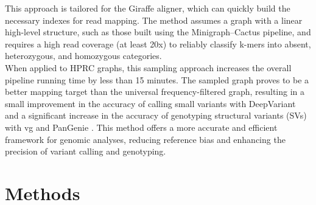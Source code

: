 \documentclass[11pt]{ucthesis}
\begin{document}
This approach is tailored for the Giraffe aligner, which can quickly build the necessary indexes for read mapping. The method assumes a graph with a linear high-level structure, such as those built using the Minigraph–Cactus \cite{hickey2024pangenome} pipeline, and requires a high read coverage (at least 20x) to reliably classify k-mers into absent, heterozygous, and homozygous categories.
\\
When applied to HPRC graphs, this sampling approach increases the overall pipeline running time by less than 15 minutes. The sampled graph proves to be a better mapping target than the universal frequency-filtered graph, resulting in a small improvement in the accuracy of calling small variants with DeepVariant \cite{poplin2018universal} and a significant increase in the accuracy of genotyping structural variants (SVs) with vg \cite{hickey2020genotyping} and PanGenie \cite{ebler2022pangenome}. This method offers a more accurate and efficient framework for genomic analyses, reducing reference bias and enhancing the precision of variant calling and genotyping.

\section{Methods}
\end{document}
